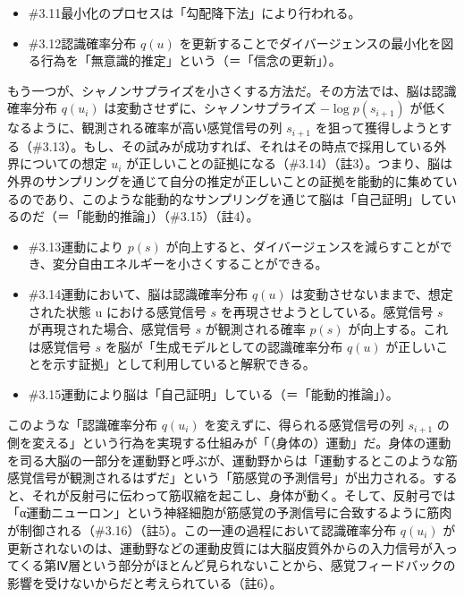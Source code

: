 \begin{note}{}
  \begin{itemize}
    \tightlist
    \item{\#3.11}最小化のプロセスは「勾配降下法」により行われる。
    \item{\#3.12}認識確率分布 $q(u)$ を更新することでダイバージェンスの最小化を図る行為を「無意識的推定」という（＝「信念の更新」）。
  \end{itemize}
\end{note}

もう一つが、シャノンサプライズを小さくする方法だ。その方法では、脳は認識確率分布
\(q(u_i)\) は変動させずに、シャノンサプライズ \(-\log{p(s_{i+1})}\)
が低くなるように、観測される確率が高い感覚信号の列 \(s_{i+1}\)
を狙って獲得しようとする（\#3.13）。もし、その試みが成功すれば、それはその時点で採用している外界についての想定
\(u_i\)
が正しいことの証拠になる（\#3.14）（註3）。つまり、脳は外界のサンプリングを通じて自分の推定が正しいことの証拠を能動的に集めているのであり、このような能動的なサンプリングを通じて脳は「自己証明」しているのだ（＝「能動的推論」）（\#3.15）（註4）。

\begin{note}{}
  \begin{itemize}
    \tightlist
    \item{\#3.13}運動により $p(s)$ が向上すると、ダイバージェンスを減らすことができ、変分自由エネルギーを小さくすることができる。
    \item{\#3.14}運動において、脳は認識確率分布 $q(u)$ は変動させないままで、想定された状態 u における感覚信号 $s$ を再現させようとしている。感覚信号 $s$ が再現された場合、感覚信号 $s$ が観測される確率 $p(s)$ が向上する。これは感覚信号 $s$ を脳が「生成モデルとしての認識確率分布 $q(u)$ が正しいことを示す証拠」として利用していると解釈できる。
    \item{\#3.15}運動により脳は「自己証明」している（＝「能動的推論」）。
  \end{itemize}
\end{note}

このような「認識確率分布 \(q(u_i)\) を変えずに、得られる感覚信号の列
\(s_{i+1}\)
の側を変える」という行為を実現する仕組みが「（身体の）運動」だ。身体の運動を司る大脳の一部分を運動野と呼ぶが、運動野からは「運動するとこのような筋感覚信号が観測されるはずだ」という「筋感覚の予測信号」が出力される。すると、それが反射弓に伝わって筋収縮を起こし、身体が動く。そして、反射弓では「α運動ニューロン」という神経細胞が筋感覚の予測信号に合致するように筋肉が制御される（\#3.16）（註5）。この一連の過程において認識確率分布
\(q(u_i)\)
が更新されないのは、運動野などの運動皮質には大脳皮質外からの入力信号が入ってくる第Ⅳ層という部分がほとんど見られないことから、感覚フィードバックの影響を受けないからだと考えられている（註6）。

